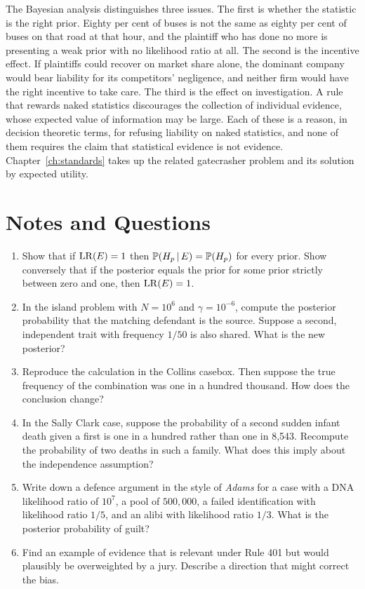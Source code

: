 The Bayesian analysis distinguishes three issues. The first is whether the statistic is the right prior. Eighty per cent of buses is not the same as eighty per cent of buses on that road at that hour, and the plaintiff who has done no more is presenting a weak prior with no likelihood ratio at all. The second is the incentive effect. If plaintiffs could recover on market share alone, the dominant company would bear liability for its competitors' negligence, and neither firm would have the right incentive to take care. The third is the effect on investigation. A rule that rewards naked statistics discourages the collection of individual evidence, whose expected value of information may be large. Each of these is a reason, in decision theoretic terms, for refusing liability on naked statistics, and none of them requires the claim that statistical evidence is not evidence. Chapter~\ref{ch:standards} takes up the related gatecrasher problem and its solution by expected utility.

\section*{Notes and Questions}
\begin{enumerate}[label=\arabic*.]
\item Show that if $\mathrm{LR}(E) = 1$ then $\mathbb{P}(H_{p}\,\vert\, E) = \mathbb{P}(H_{p})$ for every prior. Show conversely that if the posterior equals the prior for some prior strictly between zero and one, then $\mathrm{LR}(E) = 1$.
\item In the island problem with $N = 10^6$ and $\gamma = 10^{-6}$, compute the posterior probability that the matching defendant is the source. Suppose a second, independent trait with frequency $1/50$ is also shared. What is the new posterior?
\item Reproduce the calculation in the Collins casebox. Then suppose the true frequency of the combination was one in a hundred thousand. How does the conclusion change?
\item In the Sally Clark case, suppose the probability of a second sudden infant death given a first is one in a hundred rather than one in 8{,}543. Recompute the probability of two deaths in such a family. What does this imply about the independence assumption?
\item Write down a defence argument in the style of \emph{Adams} for a case with a DNA likelihood ratio of $10^7$, a pool of $500{,}000$, a failed identification with likelihood ratio $1/5$, and an alibi with likelihood ratio $1/3$. What is the posterior probability of guilt?
\item Find an example of evidence that is relevant under Rule 401 but would plausibly be overweighted by a jury. Describe a direction that might correct the bias.
\end{enumerate}

